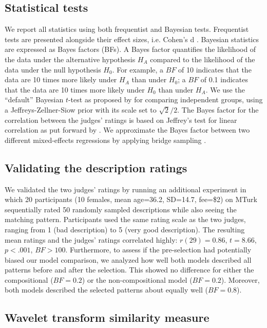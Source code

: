 \documentclass[a4paper,man, floatsintext, natbib]{apa6}
\begin{document}
\subsection{Statistical tests}

We report all statistics using both frequentist and Bayesian tests. Frequentist tests are presented alongside their effect sizes, i.e. Cohen's d \citep[Cohen's d;][]{cohen1988statistical}. Bayesian statistics are expressed as Bayes factors (BFs). A Bayes factor quantifies the likelihood of the data under the alternative hypothesis $H_A$ compared to the likelihood of the data under the null hypothesis $H_0$. For example, a $BF$ of 10 indicates that the data are 10 times more likely under $H_A$ than under $H_0$; a $BF$ of 0.1 indicates that the data are 10 times more likely under $H_0$ than under $H_A$.
We use the ``default'' Bayesian $t$-test as proposed by \cite{Rouder2012} for comparing independent groups, using a Jeffreys-Zellner-Siow prior with its scale set to $\sqrt{2}/2$. The Bayes factor for the correlation between the judges' ratings is based on Jeffrey's test for linear correlation as put forward by \cite{ly2016harold}. We approximate the Bayes factor between two different mixed-effects regressions by applying bridge sampling \citep{gronau2017tutorial}.

\subsection{Validating the description ratings}
We validated the two judges' ratings by running an additional experiment in which 20 participants (10 females, mean age=36.2, SD=14.7, fee=\$2) on MTurk sequentially rated 50 randomly sampled descriptions while also seeing the matching pattern. Participants used the same rating scale as the two judges, ranging from 1 (bad description) to 5 (very good description). The resulting mean ratings and the judges' ratings correlated highly: $r(29)=0.86$, $t=8.66$, $p<.001$, $BF>100$. Furthermore, to assess if the pre-selection had potentially biased our model comparison, we analyzed how well both models described all patterns before and after the selection. This showed no difference for either the compositional ($BF=0.2$) or the non-compositional model ($BF=0.2$). Moreover, both models described the selected patterns about equally well ($BF=0.8$).

\subsection{Wavelet transform similarity measure}
\end{document}
